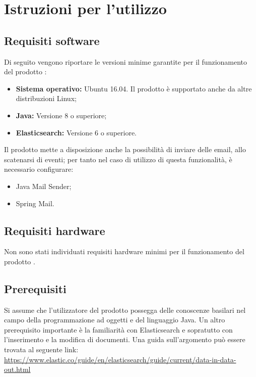 \section{Istruzioni per l'utilizzo} \label{infoUtili}

	\subsection{Requisiti software} \label{reqsoftware}

		Di seguito vengono riportare le versioni minime garantite per il funzionamento del prodotto \ProjectName{}:

		\begin{itemize}
			\item \textbf{Sistema operativo:} Ubuntu 16.04. Il prodotto è supportato anche da altre distribuzioni Linux;
			\item \textbf{Java:} Versione 8 o superiore;
			\item \textbf{Elasticsearch:} Versione 6 o superiore.
		\end{itemize}

		Il prodotto mette a disposizione anche la possibilità di inviare delle email, allo scatenarsi di eventi; per tanto nel caso di utilizzo di questa
		funzionalità, è necessario configurare:

		\begin{itemize}
			\item Java Mail Sender;
			\item Spring Mail.
		\end{itemize}

	\subsection{Requisiti hardware}

		Non sono stati individuati requisiti hardware minimi per il funzionamento del prodotto \ProjectName{}.

	\subsection{Prerequisiti}

		Si assume che l'utilizzatore del prodotto \ProjectName{} possegga delle conoscenze basilari nel campo della programmazione ad
oggetti e del linguaggio Java. Un altro prerequisito importante è la familiarità con Elasticsearch e sopratutto con l'inserimento e la modifica di documenti.
Una guida sull'argomento può essere trovata al seguente link: \\
\url{https://www.elastic.co/guide/en/elasticsearch/guide/current/data-in-data-out.html}

